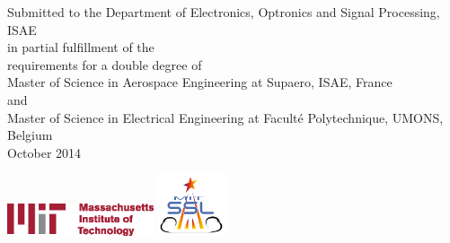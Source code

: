 \documentclass[12pt,twoside]{article}
\begin{document}
\begin{titlepage}
\begin{center}
{\large Submitted to the Department of Electronics, Optronics and Signal Processing, ISAE \\
in partial fulfillment of the \\
requirements for a double degree of \\
\vspace{20pt}
Master of Science in Aerospace Engineering at Supaero, ISAE, France}\\
\vspace{5pt}
and\\
\vspace{5pt}
{\large Master of Science in Electrical Engineering at Facult\'{e} Polytechnique, UMONS, Belgium}\\
\vspace{40pt}
{\Large October 2014}
\end{center}
\hspace{20pt}
\includegraphics[width=4.3cm]{img/mit.eps}
\hspace{320pt}
\includegraphics[width=2cm]{img/ssl.png}
\end{titlepage}
\end{document}
